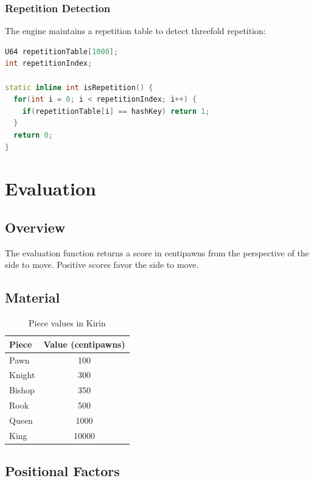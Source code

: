 \documentclass[11pt,a4paper]{report}
\begin{document}
\subsection{Repetition Detection}

The engine maintains a repetition table to detect threefold repetition:

\begin{lstlisting}[language=C++]
U64 repetitionTable[1000]; 
int repetitionIndex;

static inline int isRepetition() {
  for(int i = 0; i < repetitionIndex; i++) {
    if(repetitionTable[i] == hashKey) return 1;
  }
  return 0;
}
\end{lstlisting}

\chapter{Evaluation}

\section{Overview}

The evaluation function returns a score in centipawns from the perspective of the side to move. Positive scores favor the side to move.

\section{Material}

\begin{table}[h]
\centering
\begin{tabular}{lc}
\toprule
\textbf{Piece} & \textbf{Value (centipawns)} \\
\midrule
Pawn & 100 \\
Knight & 300 \\
Bishop & 350 \\
Rook & 500 \\
Queen & 1000 \\
King & 10000 \\
\bottomrule
\end{tabular}
\caption{Piece values in Kirin}
\end{table}

\section{Positional Factors}
\end{document}
